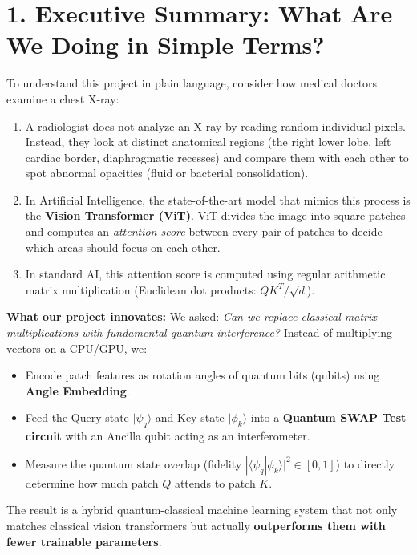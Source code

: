 \documentclass[11pt,a4paper]{article}
\begin{document}
\vspace{0.2cm}

\section{1. Executive Summary: What Are We Doing in Simple Terms?}

To understand this project in plain language, consider how medical doctors examine a chest X-ray:
\begin{enumerate}
    \item A radiologist does not analyze an X-ray by reading random individual pixels. Instead, they look at distinct anatomical regions (the right lower lobe, left cardiac border, diaphragmatic recesses) and compare them with each other to spot abnormal opacities (fluid or bacterial consolidation).
    \item In Artificial Intelligence, the state-of-the-art model that mimics this process is the \textbf{Vision Transformer (ViT)}. ViT divides the image into square patches and computes an \textit{attention score} between every pair of patches to decide which areas should focus on each other.
    \item In standard AI, this attention score is computed using regular arithmetic matrix multiplication (Euclidean dot products: $Q K^T / \sqrt{d}$).
\end{enumerate}

\textbf{What our project innovates:}
We asked: \textit{Can we replace classical matrix multiplications with fundamental quantum interference?}
Instead of multiplying vectors on a CPU/GPU, we:
\begin{itemize}
    \item Encode patch features as rotation angles of quantum bits (qubits) using \textbf{Angle Embedding}.
    \item Feed the Query state $|\psi_q\rangle$ and Key state $|\phi_k\rangle$ into a \textbf{Quantum SWAP Test circuit} with an Ancilla qubit acting as an interferometer.
    \item Measure the quantum state overlap (fidelity $|\langle \psi_q | \phi_k \rangle|^2 \in [0, 1]$) to directly determine how much patch $Q$ attends to patch $K$.
\end{itemize}

The result is a hybrid quantum-classical machine learning system that not only matches classical vision transformers but actually \textbf{outperforms them with fewer trainable parameters}.
\end{document}
